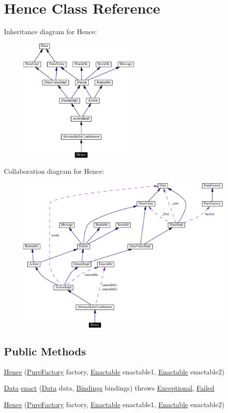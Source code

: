 \hypertarget{classHence}{
\section{Hence  Class Reference}
\label{classHence}
}
Inheritance diagram for Hence:\begin{figure}[H]
\begin{center}
\leavevmode
\includegraphics[width=170pt]{classHence__inherit__graph}
\end{center}
\end{figure}
Collaboration diagram for Hence:\begin{figure}[H]
\begin{center}
\leavevmode
\includegraphics[width=308pt]{classHence__coll__graph}
\end{center}
\end{figure}
\subsection*{Public Methods}
\begin{CompactItemize}
\item 
\hyperlink{classHence_a0}{Hence} (\hyperlink{classPureFactory}{Pure\-Factory} factory, \hyperlink{interfaceEnactable}{Enactable} enactable1, \hyperlink{interfaceEnactable}{Enactable} enactable2)
\item 
\hyperlink{interfaceData}{Data} \hyperlink{classHence_a1}{enact} (\hyperlink{interfaceData}{Data} data, \hyperlink{interfaceBindings}{Bindings} bindings) throws \hyperlink{classExceptional}{Exceptional}, \hyperlink{classFailed}{Failed}
\item 
\hyperlink{classHence_a2}{Hence} (\hyperlink{classPureFactory}{Pure\-Factory} factory, \hyperlink{interfaceEnactable}{Enactable} enactable1, \hyperlink{interfaceEnactable}{Enactable} enactable2)
\end{CompactItemize}


